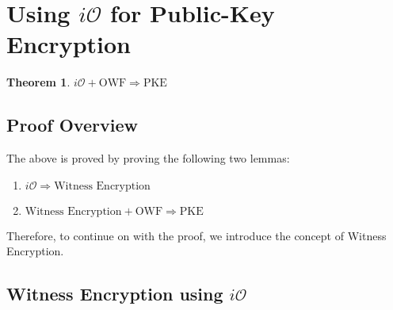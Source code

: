 \documentclass{article}
\newtheorem{theorem}{Theorem}%
\newcommand{\io}{i\mathcal{O}}
\begin{document}
\section{Using $\io$ for Public-Key Encryption}
\begin{theorem}
    $\io + \text{OWF} \Rightarrow \text{PKE}$
\end{theorem}
\subsection{Proof Overview}
The above is proved by proving the following two lemmas:
    \begin{enumerate}
        \item $\io \Rightarrow \text{Witness Encryption}$
        \item $\text{Witness Encryption} + \text{OWF} \Rightarrow\text{PKE}$
    \end{enumerate}
Therefore, to continue on with the proof, we introduce the concept of Witness Encryption.
\subsection{Witness Encryption using $\io$}
\end{document}
